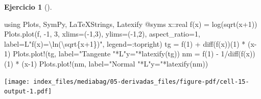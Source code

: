 \documentclass[
  a4paper,
]{scrreport}
\newenvironment{Shaded}{\begin{snugshade}}{\end{snugshade}}
\newcommand{\BuiltInTok}[1]{\textcolor[rgb]{0.00,0.23,0.31}{#1}}
\newcommand{\DataTypeTok}[1]{\textcolor[rgb]{0.68,0.00,0.00}{#1}}
\newcommand{\FloatTok}[1]{\textcolor[rgb]{0.68,0.00,0.00}{#1}}
\newcommand{\FunctionTok}[1]{\textcolor[rgb]{0.28,0.35,0.67}{#1}}
\newcommand{\ImportTok}[1]{\textcolor[rgb]{0.00,0.46,0.62}{#1}}
\newcommand{\NormalTok}[1]{\textcolor[rgb]{0.00,0.23,0.31}{#1}}
\newcommand{\OperatorTok}[1]{\textcolor[rgb]{0.37,0.37,0.37}{#1}}
\newcommand{\PreprocessorTok}[1]{\textcolor[rgb]{0.68,0.00,0.00}{#1}}
\newcommand{\StringTok}[1]{\textcolor[rgb]{0.13,0.47,0.30}{#1}}
\theoremstyle{definition}
\newtheorem{exercise}{Ejercicio}[chapter]
\theoremstyle{remark}
\begin{document}
\begin{exercise}[]
\begin{tcolorbox}
\begin{Shaded}
\begin{Highlighting}[]
\ImportTok{using} \BuiltInTok{Plots}\NormalTok{, }\BuiltInTok{SymPy}\NormalTok{, }\BuiltInTok{LaTeXStrings}\NormalTok{, }\BuiltInTok{Latexify}
\PreprocessorTok{@syms}\NormalTok{ x}\OperatorTok{::}\DataTypeTok{real}
\FunctionTok{f}\NormalTok{(x) }\OperatorTok{=} \FunctionTok{log}\NormalTok{(}\FunctionTok{sqrt}\NormalTok{(x}\OperatorTok{+}\FloatTok{1}\NormalTok{))}
\NormalTok{Plots.}\FunctionTok{plot}\NormalTok{(f, }\OperatorTok{{-}}\FloatTok{1}\NormalTok{, }\FloatTok{3}\NormalTok{, xlims}\OperatorTok{=}\NormalTok{(}\OperatorTok{{-}}\FloatTok{1}\NormalTok{,}\FloatTok{3}\NormalTok{), ylims}\OperatorTok{=}\NormalTok{(}\OperatorTok{{-}}\FloatTok{1}\NormalTok{,}\FloatTok{2}\NormalTok{), aspect\_ratio}\OperatorTok{=}\FloatTok{1}\NormalTok{, label}\OperatorTok{=}\NormalTok{L}\StringTok{"f(x)=\textbackslash{}ln(\textbackslash{}sqrt\{x+1\})"}\NormalTok{, legend}\OperatorTok{=:}\NormalTok{topright)}
\NormalTok{tg }\OperatorTok{=} \FunctionTok{f}\NormalTok{(}\FloatTok{1}\NormalTok{) }\OperatorTok{+} \FunctionTok{diff}\NormalTok{(}\FunctionTok{f}\NormalTok{(x))(}\FloatTok{1}\NormalTok{) }\OperatorTok{*}\NormalTok{ (x}\OperatorTok{{-}}\FloatTok{1}\NormalTok{)}
\NormalTok{Plots.}\FunctionTok{plot!}\NormalTok{(tg, label}\OperatorTok{=}\StringTok{"Tangente "}\OperatorTok{*}\NormalTok{L}\StringTok{"y="}\FunctionTok{*latexify}\NormalTok{(tg))}
\NormalTok{nm }\OperatorTok{=} \FunctionTok{f}\NormalTok{(}\FloatTok{1}\NormalTok{) }\OperatorTok{{-}} \FloatTok{1}\OperatorTok{/}\FunctionTok{diff}\NormalTok{(}\FunctionTok{f}\NormalTok{(x))(}\FloatTok{1}\NormalTok{) }\OperatorTok{*}\NormalTok{ (x}\OperatorTok{{-}}\FloatTok{1}\NormalTok{)}
\NormalTok{Plots.}\FunctionTok{plot!}\NormalTok{(nm, label}\OperatorTok{=}\StringTok{"Normal "}\OperatorTok{*}\NormalTok{L}\StringTok{"y="}\FunctionTok{*latexify}\NormalTok{(nm))}
\end{Highlighting}
\end{Shaded}

\texttt{[image: index\_files/mediabag/05-derivadas\_files/figure-pdf/cell-15-output-1.pdf]}

\end{tcolorbox}

\end{exercise}
\end{document}
